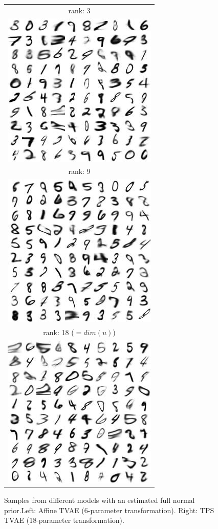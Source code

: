 \documentclass[letterpaper, twoside]{article}
\begin{document}
\begin{figure}[H]
\begin{minipage}{.5\textwidth}
\begin{tabular}{|@{}c@{}|}
\end{tabular}
\end{minipage}%
\begin{minipage}{.5\textwidth}
\centering
\begin{tabular}{|@{}c@{}|}
\hline
rank: 3\\
\includegraphics[scale=1]{manifold_sig_50.jpg}\\ \hline
rank: 9\\
\includegraphics[scale=1]{manifold_sig_51.jpg}\\ \hline
rank: 18 ($=dim(u)$)\\
\includegraphics[scale=1]{manifold_sig_52.jpg}\\ \hline
\end{tabular}
\end{minipage}%
\caption{Samples from different models with an estimated full normal prior.Left: Affine TVAE (6-parameter transformation). Right: TPS TVAE (18-parameter transformation).}
\label{generatedfullprior} 
\end{figure}
\end{document}
